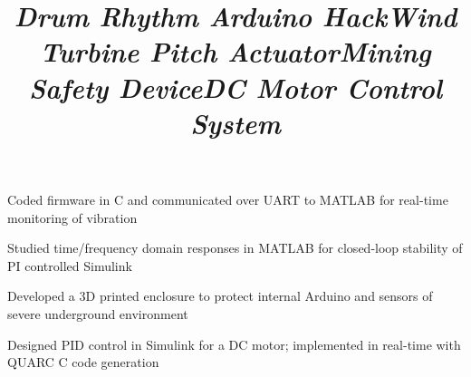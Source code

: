 \documentclass[mm]{res}
\newcommand{\tb}{\textbullet \xspace}
\begin{document}
\begin{resume}
\title{\textsl{Drum Rhythm Arduino Hack}}
\begin{position}
\tb Coded firmware in C and communicated over UART to MATLAB for real-time monitoring of vibration
\end{position}

\title{\textsl{Wind Turbine Pitch Actuator}}
\begin{position}
\tb Studied time/frequency domain responses in MATLAB for closed-loop stability of PI controlled Simulink
\end{position}

\title{\textsl{Mining Safety Device}}
\begin{position}
\tb Developed a 3D printed enclosure to protect internal Arduino and sensors of severe underground environment
\end{position}

\title{\textsl{DC Motor Control System}}
\begin{position}
\tb Designed PID control in Simulink for a DC motor; implemented in real-time with QUARC C code generation
\end{position}



%


\end{resume}
\end{document}
